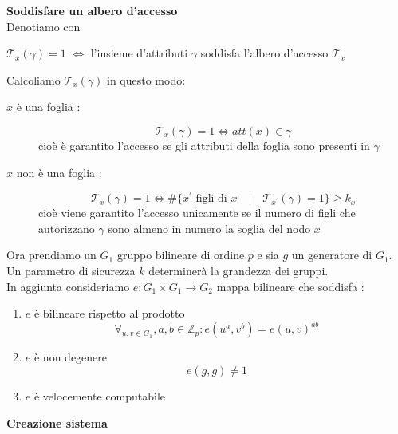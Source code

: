 \textbf{Soddisfare un albero d'accesso}\\
Denotiamo con 
\begin{center}
$\mathcal{T}_x(\gamma) = 1$ $\Leftrightarrow$ l'insieme d'attributi $\gamma$ soddisfa l'albero d'accesso $\mathcal{T}_x$
\end{center}
Calcoliamo $\mathcal{T}_x(\gamma)$ in questo modo:
\begin{description}
\item[$x$ è una foglia :] \[\mathcal{T}_x(\gamma) = 1 \Leftrightarrow att(x) \in \gamma\]
cioè è garantito l'accesso se gli attributi della foglia sono presenti in $\gamma$
\item[$x$ non è una foglia :] \[\mathcal{T}_x(\gamma) = 1  \Leftrightarrow \# \{x^\prime \text{ figli di } x \quad|\quad \mathcal{T}_{x^\prime}(\gamma) = 1  \} \geq k_x\]
cioè viene garantito l'accesso unicamente se il numero di figli che autorizzano $\gamma$ sono almeno in numero la soglia del nodo $x$ 
\end{description}


Ora prendiamo un $G_1$ gruppo bilineare di ordine $p$ e sia $g$ un generatore di $G_1$.\\
Un parametro di sicurezza $k$ determinerà la grandezza dei gruppi.\\
In aggiunta consideriamo $e : G_1 \times G_1 \rightarrow G_2$ mappa bilineare che soddisfa :
\begin{enumerate}
\item $e$ è bilineare rispetto al prodotto
\[ \forall_{u,v \in G_1}, a,b \in \mathbb{Z}_p : e(u^a,v^b) = e(u,v)^{ab} \]
\item $e$ è non degenere \[e(g,g) \neq 1\]
\item $e$ è velocemente computabile
\end{enumerate}




\textbf{Creazione sistema}

